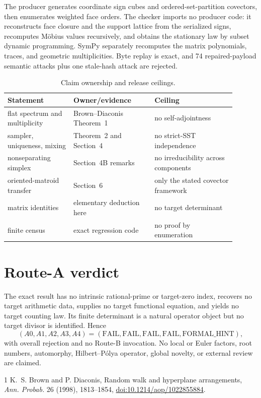 \documentclass[10pt]{article}
\begin{document}
The producer generates coordinate sign cubes and ordered-set-partition
covectors, then enumerates weighted face orders.  The checker imports no
producer code: it reconstructs face closure and the support lattice from the
serialized signs, recomputes M\"obius values recursively, and obtains the
stationary law by subset dynamic programming.  SymPy separately recomputes the
matrix polynomials, traces, and geometric multiplicities.  Byte replay is exact,
and 74 repaired-payload semantic attacks plus one stale-hash attack are rejected.

\begin{table}[ht]
\centering\small
\begin{tabular}{@{}p{0.26\linewidth}p{0.32\linewidth}p{0.32\linewidth}@{}}
\toprule
Statement & Owner/evidence & Ceiling \\
\midrule
flat spectrum and multiplicity & Brown--Diaconis Theorem~1 & no self-adjointness \\
sampler, uniqueness, mixing & Theorem~2 and Section~4 & no strict-SST independence \\
nonseparating simplex & Section~4B remarks & no irreducibility across components \\
oriented-matroid transfer & Section~6 & only the stated covector framework \\
matrix identities & elementary deduction here & no target determinant \\
finite census & exact regression code & no proof by enumeration \\
\bottomrule
\end{tabular}
\caption{Claim ownership and release ceilings.}
\end{table}

\section{Route-A verdict}
The exact result has no intrinsic rational-prime or target-zero index, recovers
no target arithmetic data, supplies no target functional equation, and yields
no target counting law.  Its finite determinant is a natural operator object
but no target divisor is identified.  Hence
\[
 (A0,A1,A2,A3,A4)=(\mathrm{FAIL},\mathrm{FAIL},\mathrm{FAIL},
 \mathrm{FAIL},\mathrm{FORMAL\_HINT}),
\]
with overall rejection and no Route-B invocation.  No local or Euler factors,
root numbers, automorphy, Hilbert--P\'olya operator, global novelty, or external
review are claimed.

\begin{thebibliography}{1}
K.~S. Brown and P. Diaconis,
\newblock Random walk and hyperplane arrangements,
\newblock \emph{Ann. Probab.} 26 (1998), 1813--1854,
\newblock \href{https://doi.org/10.1214/aop/1022855884}{doi:10.1214/aop/1022855884}.
\end{thebibliography}
\end{document}
